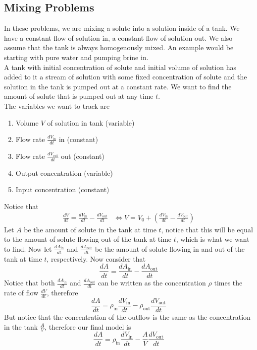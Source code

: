\documentclass[notes.tex]{subfiles}
\begin{document}
\subsection{Mixing Problems}
In these problems, we are mixing a solute into a solution inside of a tank. We have a constant flow of solution in, a constant flow of solution out. We also assume that the tank is always homogenously mixed. An example would be starting with pure water and pumping brine in. \\
A tank with initial concentration of solute and initial volume of solution has added to it a stream of solution with some fixed concentration of solute and the solution in the tank is pumped out at a constant rate. We want to find the amount of solute that is pumped out at any time $t$. \\
The variables we want to track are
\begin{enumerate}[label = \textbullet]
    \item Volume $V$ of solution in tank (variable)
    \item Flow rate $\frac{dV_{\mathrm{in}}}{dt}$ in (constant)
    \item Flow rate $\frac{dV_{\mathrm{out}}}{dt}$ out (constant)
    \item Output concentration (variable)
    \item Input concentration (constant)
\end{enumerate}
Notice that
\begin{align*}
    \frac{dV}{dt} = \frac{dV_{\mathrm{in}}}{dt} - \frac{dV_{\mathrm{out}}}{dt}
    &\iff V = V_0 + \left( \frac{dV_{\mathrm{in}}}{dt} - \frac{dV_{\mathrm{out}}}{dt} \right)
\end{align*}
Let $A$ be the amount of solute in the tank at time $t$, notice that this will be equal to the amount of solute flowing out of the tank at time $t$, which is what we want to find. Now let $\frac{dA_{\mathrm{in}}}{dt}$ and $\frac{dA_{\mathrm{out}}}{dt}$ be the amount of solute flowing in and out of the tank at time $t$, respectively. Now consider that
\[
    \frac{dA}{dt} = \frac{dA_{\mathrm{in}}}{dt} - \frac{dA_{\mathrm{out}}}{dt}
\]
Notice that both $\frac{dA_{\mathrm{in}}}{dt}$ and $\frac{dA_{\mathrm{out}}}{dt}$ can be written as the concentration $\rho$ times the rate of flow $\frac{dV}{dt}$, therefore
\[
    \frac{dA}{dt} = \rho_{\mathrm{in}}\frac{dV_{\mathrm{in}}}{dt} - \rho_{\mathrm{out}}\frac{dV_{\mathrm{out}}}{dt}
\]
But notice that the concentration of the outflow is the same as the concentration in the tank $\frac{A}{V}$, therefore our final model is
\[
    \frac{dA}{dt} = \rho_{\mathrm{in}}\frac{dV_{\mathrm{in}}}{dt} - \frac{A}{V}\frac{dV_{\mathrm{out}}}{dt}
\]
\end{document}
